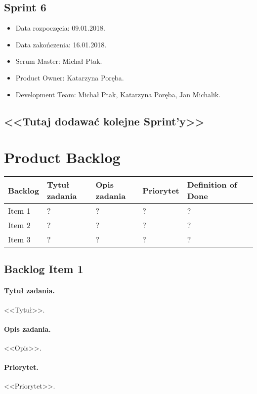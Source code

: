 \documentclass[a4paper]{article}
\begin{document}
\subsection{Sprint 6}

\begin{itemize}
\item Data rozpoczęcia: 09.01.2018.
\item Data zakończenia: 16.01.2018.
\item Scrum Master: Michał Ptak.
\item Product Owner: Katarzyna Poręba.
\item Development Team: Michał Ptak, Katarzyna Poręba, Jan Michalik.
\end{itemize}

\subsection*{<<Tutaj dodawać kolejne Sprint'y>>}

\section{Product Backlog}

\begin{center}
	\begin{tabular}{ |l|l|l|l|l|l| }
	\hline
	Backlog & Tytuł zadania & Opis zadania & Priorytet & Definition of Done \\
	\hline
	Item 1 & ? & ? & ? & ? \\
	\hline
	Item 2 & ? & ? & ? & ? \\
	\hline
	Item 3 & ? & ? & ? & ? \\
	\hline
	\end{tabular}
\end{center}

\subsection{Backlog Item 1}
\paragraph{Tytuł zadania.} <<Tytuł>>.
\paragraph{Opis zadania.} <<Opis>>.
\paragraph{Priorytet.} <<Priorytet>>.
\end{document}
